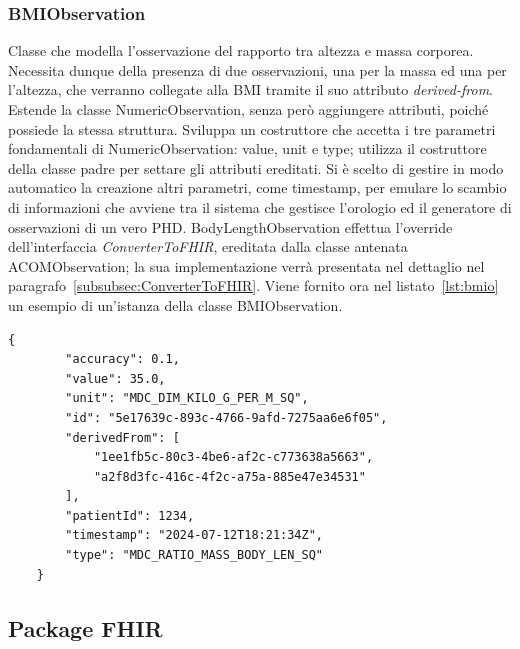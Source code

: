 \documentclass[a4paper]{article}
\begin{document}
\subsubsection*{BMIObservation}
Classe che modella l'osservazione del rapporto tra altezza e massa corporea.
Necessita dunque della presenza di due osservazioni, una per la massa ed una per l'altezza, che verranno collegate alla BMI tramite il suo attributo \textit{derived-from}.
Estende la classe NumericObservation, senza però aggiungere attributi, poiché possiede la stessa struttura.
Sviluppa un costruttore che accetta i tre parametri fondamentali di NumericObservation: value, unit e type; utilizza il costruttore della classe padre per settare gli attributi ereditati.
Si è scelto di gestire in modo automatico la creazione altri parametri, come timestamp, per emulare lo scambio di informazioni che avviene tra il sistema che gestisce l'orologio ed il generatore di osservazioni di un vero PHD.
BodyLengthObservation effettua l'override dell'interfaccia \textit{ConverterToFHIR}, ereditata dalla classe antenata ACOMObservation; la sua implementazione verrà presentata nel dettaglio nel paragrafo~\ref{subsubsec:ConverterToFHIR}.
Viene fornito ora nel listato~\ref{lst:bmio} un esempio di un'istanza della classe BMIObservation.
\begin{lstlisting}[caption={Esempio istanza di BMIObservation},label={lst:bmio}]
    {
        "accuracy": 0.1,
        "value": 35.0,
        "unit": "MDC_DIM_KILO_G_PER_M_SQ",
        "id": "5e17639c-893c-4766-9afd-7275aa6e6f05",
        "derivedFrom": [
            "1ee1fb5c-80c3-4be6-af2c-c773638a5663",
            "a2f8d3fc-416c-4f2c-a75a-885e47e34531"
        ],
        "patientId": 1234,
        "timestamp": "2024-07-12T18:21:34Z",
        "type": "MDC_RATIO_MASS_BODY_LEN_SQ"
    }
\end{lstlisting}
\subsection{Package FHIR}
\end{document}
